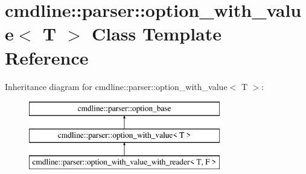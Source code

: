 \hypertarget{classcmdline_1_1parser_1_1option__with__value}{}\section{cmdline\+::parser\+::option\+\_\+with\+\_\+value$<$ T $>$ Class Template Reference}
\label{classcmdline_1_1parser_1_1option__with__value}
Inheritance diagram for cmdline\+::parser\+::option\+\_\+with\+\_\+value$<$ T $>$\+:\begin{figure}[H]
\begin{center}
\leavevmode
\includegraphics[height=3.000000cm]{classcmdline_1_1parser_1_1option__with__value}
\end{center}
\end{figure}
